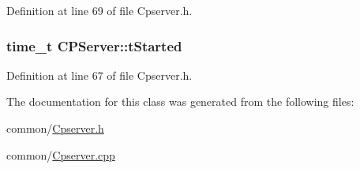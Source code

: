 \-Definition at line 69 of file \-Cpserver.\-h.

\hypertarget{class_c_p_server_a18665bfa95ace98f79d6e1b6b7a38398}{
\subsubsection[{t\-Started}]{\setlength{\rightskip}{0pt plus 5cm}time\-\_\-t {\bf \-C\-P\-Server\-::t\-Started}}}\label{class_c_p_server_a18665bfa95ace98f79d6e1b6b7a38398}


\-Definition at line 67 of file \-Cpserver.\-h.



\-The documentation for this class was generated from the following files\-:\begin{DoxyCompactItemize}
\item 
common/\hyperlink{_cpserver_8h}{\-Cpserver.\-h}\item 
common/\hyperlink{_cpserver_8cpp}{\-Cpserver.\-cpp}\end{DoxyCompactItemize}
